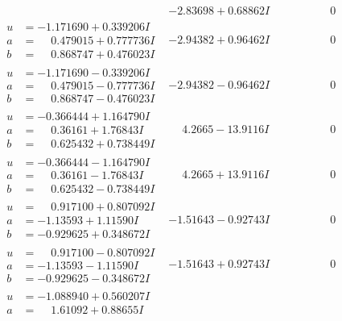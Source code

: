 \documentclass[1p]{elsarticle_modified}
\theoremstyle{definition}
\begin{document}
$$\begin{array}{c|c|c}
 & -2.83698 + 0.68862 I & \phantom{-0.000000 } 0 \\ \hline\begin{aligned}
u &= -1.171690 + 0.339206 I \\
a &= \phantom{-}0.479015 + 0.777736 I \\
b &= \phantom{-}0.868747 + 0.476023 I\end{aligned}
 & -2.94382 + 0.96462 I & \phantom{-0.000000 } 0 \\ \hline\begin{aligned}
u &= -1.171690 - 0.339206 I \\
a &= \phantom{-}0.479015 - 0.777736 I \\
b &= \phantom{-}0.868747 - 0.476023 I\end{aligned}
 & -2.94382 - 0.96462 I & \phantom{-0.000000 } 0 \\ \hline\begin{aligned}
u &= -0.366444 + 1.164790 I \\
a &= \phantom{-}0.36161 + 1.76843 I \\
b &= \phantom{-}0.625432 + 0.738449 I\end{aligned}
 & \phantom{-}4.2665 - 13.9116 I & \phantom{-0.000000 } 0 \\ \hline\begin{aligned}
u &= -0.366444 - 1.164790 I \\
a &= \phantom{-}0.36161 - 1.76843 I \\
b &= \phantom{-}0.625432 - 0.738449 I\end{aligned}
 & \phantom{-}4.2665 + 13.9116 I & \phantom{-0.000000 } 0 \\ \hline\begin{aligned}
u &= \phantom{-}0.917100 + 0.807092 I \\
a &= -1.13593 + 1.11590 I \\
b &= -0.929625 + 0.348672 I\end{aligned}
 & -1.51643 - 0.92743 I & \phantom{-0.000000 } 0 \\ \hline\begin{aligned}
u &= \phantom{-}0.917100 - 0.807092 I \\
a &= -1.13593 - 1.11590 I \\
b &= -0.929625 - 0.348672 I\end{aligned}
 & -1.51643 + 0.92743 I & \phantom{-0.000000 } 0 \\ \hline\begin{aligned}
u &= -1.088940 + 0.560207 I \\
a &= \phantom{-}1.61092 + 0.88655 I \\

\end{aligned}
\end{array}$$
\end{document}
